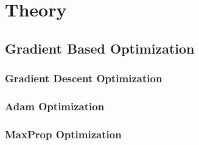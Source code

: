 \chapter{Theory}


\clearpage

\section{Gradient Based Optimization}
\label{sec:theory:optimization}
\subsection{Gradient Descent Optimization}
\subsection{Adam Optimization}
\subsection{MaxProp Optimization}
\clearpage


\clearpage


\clearpage


\clearpage


\clearpage


\clearpage
